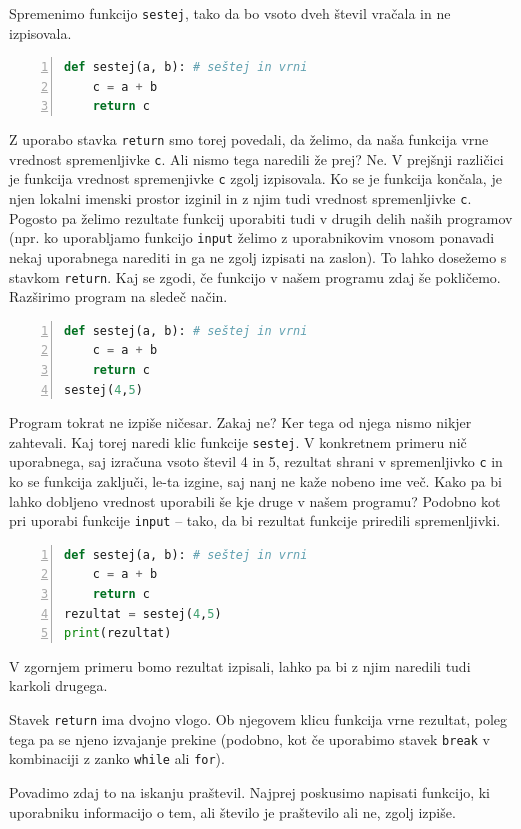 Spremenimo funkcijo \texttt{sestej}, tako da bo vsoto dveh števil vračala in ne izpisovala.
\begin{lstlisting}[language=Python,numbers=left]
def sestej(a, b): # seštej in vrni
    c = a + b
    return c
\end{lstlisting}
Z uporabo stavka \texttt{return} smo torej povedali, da želimo, da naša funkcija vrne vrednost spremenljivke \texttt{c}. Ali nismo tega naredili že prej? Ne. V prejšnji različici je funkcija vrednost spremenjivke \texttt{c} zgolj izpisovala. Ko se je funkcija končala, je njen lokalni imenski prostor izginil in z njim tudi vrednost spremenljivke \texttt{c}. Pogosto pa želimo rezultate funkcij uporabiti tudi v drugih delih naših programov (npr. ko uporabljamo funkcijo \texttt{input} želimo z uporabnikovim vnosom ponavadi nekaj uporabnega narediti in ga ne zgolj izpisati na zaslon). To lahko dosežemo s stavkom \texttt{return}. Kaj se zgodi, če funkcijo v našem programu zdaj še pokličemo. Razširimo program na sledeč način.
\begin{lstlisting}[language=Python,numbers=left]
def sestej(a, b): # seštej in vrni
    c = a + b
    return c
sestej(4,5)
\end{lstlisting}
Program tokrat ne izpiše ničesar. Zakaj ne? Ker tega od njega nismo nikjer zahtevali. Kaj torej naredi klic funkcije \texttt{sestej}. V konkretnem primeru nič uporabnega, saj izračuna vsoto števil 4 in 5, rezultat shrani v spremenljivko \texttt{c} in ko se funkcija zaključi, le-ta izgine, saj nanj ne kaže nobeno ime več. Kako pa bi lahko dobljeno vrednost uporabili še kje druge v našem programu? Podobno kot pri uporabi funkcije \texttt{input} -- tako, da bi rezultat funkcije priredili spremenljivki.
\begin{lstlisting}[language=Python,numbers=left]
def sestej(a, b): # seštej in vrni
    c = a + b
    return c
rezultat = sestej(4,5)
print(rezultat)
\end{lstlisting}
V zgornjem primeru bomo rezultat izpisali, lahko pa bi z njim naredili tudi karkoli drugega.


Stavek \texttt{return} ima dvojno vlogo. Ob njegovem klicu funkcija vrne rezultat, poleg tega pa se njeno izvajanje prekine (podobno, kot če uporabimo stavek \texttt{break} v kombinaciji z zanko \texttt{while} ali \texttt{for}).

Povadimo zdaj to na iskanju praštevil. Najprej poskusimo napisati funkcijo, ki uporabniku informacijo o tem, ali število je praštevilo ali ne, zgolj izpiše.

